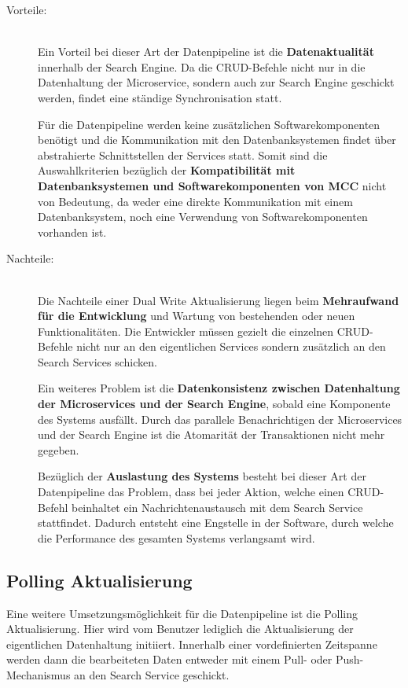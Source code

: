 \begin{description}
    \item[Vorteile:]\hfill \\
    Ein Vorteil bei dieser Art der Datenpipeline ist die \textbf{Datenaktualität} innerhalb der Search Engine. Da die CRUD-Befehle nicht nur in die Datenhaltung der Microservice, sondern auch zur Search Engine geschickt werden, findet eine ständige Synchronisation statt.
    
    Für die Datenpipeline werden keine zusätzlichen Softwarekomponenten benötigt und die Kommunikation mit den Datenbanksystemen findet über abstrahierte Schnittstellen der Services statt. Somit sind die Auswahlkriterien bezüglich der \textbf{Kompatibilität mit Datenbanksystemen und Softwarekomponenten von MCC} nicht von Bedeutung, da weder eine direkte Kommunikation mit einem Datenbanksystem, noch eine Verwendung von Softwarekomponenten vorhanden ist.
    
    \item[Nachteile:]\hfill \\
    Die Nachteile einer Dual Write Aktualisierung liegen beim \textbf{Mehraufwand für die Entwicklung} und Wartung von bestehenden oder neuen Funktionalitäten. Die Entwickler müssen gezielt die einzelnen CRUD-Befehle nicht nur an den eigentlichen Services sondern zusätzlich an den Search Services schicken.

    Ein weiteres Problem ist die \textbf{Datenkonsistenz zwischen Datenhaltung der Microservices und der Search Engine}, sobald eine Komponente des Systems ausfällt. Durch das parallele Benachrichtigen der Microservices und der Search Engine ist die Atomarität der Transaktionen nicht mehr gegeben.

    Bezüglich der \textbf{Auslastung des Systems} besteht bei dieser Art der Datenpipeline das Problem, dass bei jeder Aktion, welche einen CRUD-Befehl beinhaltet ein Nachrichtenaustausch mit dem Search Service stattfindet. Dadurch entsteht eine Engstelle in der Software, durch welche die Performance des gesamten Systems verlangsamt wird.

\end{description}

\subsection{Polling Aktualisierung\label{subsec4.1.3:Unterunterpunkt-3}}

Eine weitere Umsetzungsmöglichkeit für die Datenpipeline ist die \glqq Polling Aktualisierung\grqq{}. Hier wird vom Benutzer lediglich die Aktualisierung der eigentlichen Datenhaltung initiiert. Innerhalb einer vordefinierten Zeitspanne werden dann die bearbeiteten Daten entweder mit einem Pull- oder Push-Mechanismus an den Search Service geschickt.


